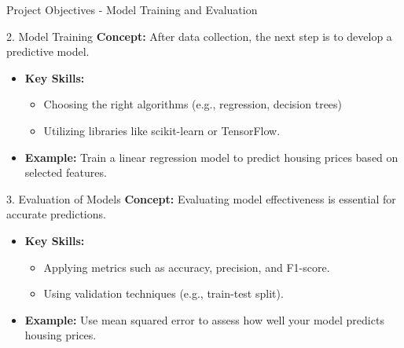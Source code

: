 \documentclass[aspectratio=169]{beamer}
\begin{document}
\begin{frame}[fragile]{Project Objectives - Model Training and Evaluation}
    \begin{block}{2. Model Training}
        \textbf{Concept:} After data collection, the next step is to develop a predictive model. 
        \begin{itemize}
            \item \textbf{Key Skills:}
                \begin{itemize}
                    \item Choosing the right algorithms (e.g., regression, decision trees)
                    \item Utilizing libraries like scikit-learn or TensorFlow.
                \end{itemize}
            \item \textbf{Example:} Train a linear regression model to predict housing prices based on selected features.
        \end{itemize}
    \end{block}

    \begin{block}{3. Evaluation of Models}
        \textbf{Concept:} Evaluating model effectiveness is essential for accurate predictions.
        \begin{itemize}
            \item \textbf{Key Skills:}
                \begin{itemize}
                    \item Applying metrics such as accuracy, precision, and F1-score.
                    \item Using validation techniques (e.g., train-test split).
                \end{itemize}
            \item \textbf{Example:} Use mean squared error to assess how well your model predicts housing prices.
        \end{itemize}
    \end{block}
\end{frame}
\end{document}
